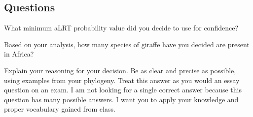 \documentclass[11pt, addpoints]{exam}
\begin{document}

\subsection*{Questions}
\label{sec:questions}

\begin{questions}

\question[1]
What minimum aLRT probability value did you decide to use for
confidence?

\question[1]
Based on your analysis, how many species of giraffe have you decided
are present in Africa? 

\question[10]
Explain your reasoning for your decision. Be as clear and
precise as possible, using examples from your phylogeny. Treat this
answer as you would an essay question on an exam. I am not looking for a
single correct answer because this question has many possible answers. I want you to
apply your knowledge and proper vocabulary gained from class.

\end{questions}
\end{document}
